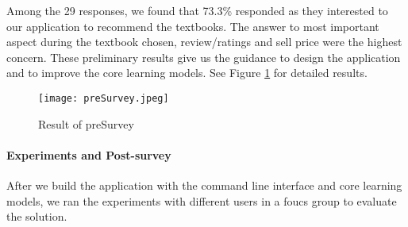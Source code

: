 Among the 29 responses, we found that 73.3\% responded as they interested to our application to recommend the textbooks. The answer to most important aspect during the textbook chosen, review/ratings and sell price were the highest concern. These preliminary results give us the guidance to design the application and to improve the core learning models. See Figure \ref{result_of_presurvey} for detailed results.

\begin{figure}[ht]
\caption{Result of preSurvey}
\label{result_of_presurvey}
\centering
\texttt{[image: preSurvey.jpeg]}
\end{figure}

\paragraph{Experiments and Post-survey}
After we build the application with the command line interface and core learning models, we ran the experiments with different users in a foucs group to evaluate the solution.

